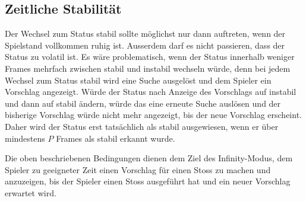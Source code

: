 \subsection{Zeitliche Stabilität}
Der Wechsel zum Status stabil sollte möglichst nur dann auftreten, wenn der Spielstand vollkommen ruhig ist.
Ausserdem darf es nicht passieren, dass der Status zu volatil ist.
Es wäre problematisch, wenn der Status innerhalb weniger Frames mehrfach zwischen stabil und instabil wechseln würde,
denn bei jedem Wechsel zum Status stabil wird eine Suche ausgelöst und dem Spieler ein Vorschlag angezeigt.
Würde der Status nach Anzeige des Vorschlags auf instabil und dann auf stabil ändern, würde das eine erneute
Suche auslösen und der bisherige Vorschlag würde nicht mehr angezeigt, bis der neue Vorschlag erscheint.
Daher wird der Status erst tatsächlich als stabil ausgewiesen, wenn er über mindestens $P$ Frames als stabil erkannt wurde.

Die oben beschriebenen Bedingungen dienen dem Ziel des Infinity-Modus, dem Spieler zu geeigneter Zeit
einen Vorschlag für einen Stoss zu machen und anzuzeigen, bis der Spieler einen Stoss ausgeführt hat
und ein neuer Vorschlag erwartet wird.
